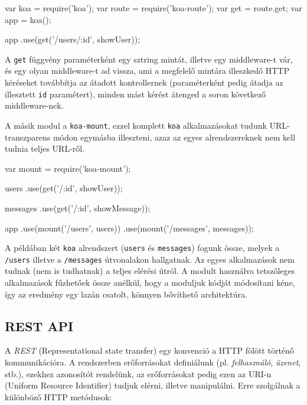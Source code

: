 \begin{js}
var koa = require('koa');
var route = require('koa-route');
var get = route.get;
var app = koa();

app
  .use(get('/users/:id', showUser));
\end{js}

A \verb=get= függvény paraméterként egy sztring mintát,
illetve egy middleware-t vár, és egy olyan middleware-t ad vissza,
ami a megfelelő mintára illeszkedő HTTP kéréseket továbbítja az átadott
kontrollernek (paraméterként pedig átadja az illesztett \verb=id= paramétert),
minden mást kérést átenged a soron következő middleware-nek.

A másik modul a \verb=koa-mount=, ezzel komplett \verb=koa= alkalmazásokat
tudunk URL-transzparens módon egymásba illeszteni, azaz az egyes
alrendszereknek nem kell tudnia teljes URL-ről.

\begin{js}
var mount = require('koa-mount');

users
  .use(get('/:id', showUser));

messages
  .use(get('/:id', showMessage));

app
  .use(mount('/users', users))
  .use(mount('/messages', messages));
\end{js}

A példában két \verb=koa= alrendszert (\verb=users= és \verb=messages=)
fogunk össze, melyek a \verb=/users= illetve a \verb=/messages= útvonalakon
hallgatnak. Az egyes alkalmazások nem tudnak (nem is tudhatnak) a
teljes elérési útról. A modult használva tetszőleges alkalmazások fűzhetőek
össze anélkül, hogy a moduljuk kódját módosítani kéne, így az eredmény
egy lazán csatolt, könnyen bővíthető architektúra.

\subsection{REST API}

A \emph{REST}\cite{REST} (Representational state transfer) egy konvenció a HTTP fölött
történő kommunikációra. A rendszerben erőforrásokat definiálunk
(pl. \emph{felhasználó}, \emph{üzenet}, stb.), ezekhez azonosítót rendelünk,
az erőforrásokat pedig ezen az URI-n (Uniform Resource Identifier) tudjuk
elérni, illetve manipulálni. Erre szolgálnak a különböző HTTP metódusok:

